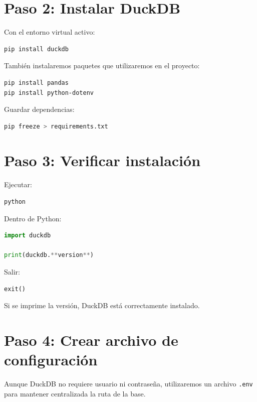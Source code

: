 \section{Paso 2: Instalar DuckDB}

Con el entorno virtual activo:

\begin{lstlisting}[language=bash]
pip install duckdb
\end{lstlisting}

También instalaremos paquetes que utilizaremos en el proyecto:

\begin{lstlisting}[language=bash]
pip install pandas
pip install python-dotenv
\end{lstlisting}

Guardar dependencias:

\begin{lstlisting}[language=bash]
pip freeze > requirements.txt
\end{lstlisting}

\section{Paso 3: Verificar instalación}

Ejecutar:

\begin{lstlisting}[language=bash]
python
\end{lstlisting}

Dentro de Python:

\begin{lstlisting}[language=Python]
import duckdb

print(duckdb.**version**)
\end{lstlisting}

Salir:

\begin{lstlisting}[language=Python]
exit()
\end{lstlisting}

Si se imprime la versión, DuckDB está correctamente instalado.

\section{Paso 4: Crear archivo de configuración}

Aunque DuckDB no requiere usuario ni contraseña, utilizaremos un archivo \texttt{.env} para mantener centralizada la ruta de la base.

